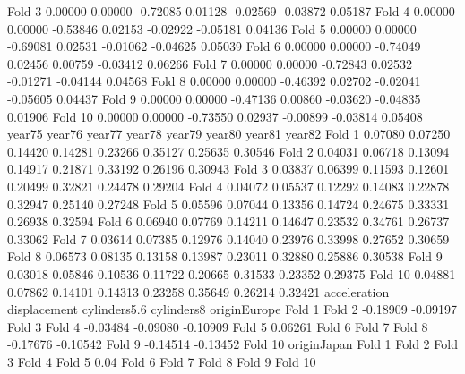 \documentclass[
]{jss}
\begin{document}
\begin{CodeChunk}
\begin{CodeOutput}
Fold 3     0.00000  0.00000 -0.72085  0.01128 -0.02569 -0.03872  0.05187
Fold 4     0.00000  0.00000 -0.53846  0.02153 -0.02922 -0.05181  0.04136
Fold 5     0.00000  0.00000 -0.69081  0.02531 -0.01062 -0.04625  0.05039
Fold 6     0.00000  0.00000 -0.74049  0.02456  0.00759 -0.03412  0.06266
Fold 7     0.00000  0.00000 -0.72843  0.02532 -0.01271 -0.04144  0.04568
Fold 8     0.00000  0.00000 -0.46392  0.02702 -0.02041 -0.05605  0.04437
Fold 9     0.00000  0.00000 -0.47136  0.00860 -0.03620 -0.04835  0.01906
Fold 10    0.00000  0.00000 -0.73550  0.02937 -0.00899 -0.03814  0.05408
          year75   year76   year77   year78   year79   year80   year81   year82
Fold 1   0.07080  0.07250  0.14420  0.14281  0.23266  0.35127  0.25635  0.30546
Fold 2   0.04031  0.06718  0.13094  0.14917  0.21871  0.33192  0.26196  0.30943
Fold 3   0.03837  0.06399  0.11593  0.12601  0.20499  0.32821  0.24478  0.29204
Fold 4   0.04072  0.05537  0.12292  0.14083  0.22878  0.32947  0.25140  0.27248
Fold 5   0.05596  0.07044  0.13356  0.14724  0.24675  0.33331  0.26938  0.32594
Fold 6   0.06940  0.07769  0.14211  0.14647  0.23532  0.34761  0.26737  0.33062
Fold 7   0.03614  0.07385  0.12976  0.14040  0.23976  0.33998  0.27652  0.30659
Fold 8   0.06573  0.08135  0.13158  0.13987  0.23011  0.32880  0.25886  0.30538
Fold 9   0.03018  0.05846  0.10536  0.11722  0.20665  0.31533  0.23352  0.29375
Fold 10  0.04881  0.07862  0.14101  0.14313  0.23258  0.35649  0.26214  0.32421
        acceleration displacement cylinders5.6 cylinders8 originEurope
Fold 1                                                                
Fold 2      -0.18909     -0.09197                                     
Fold 3                                                                
Fold 4      -0.03484                  -0.09080   -0.10909             
Fold 5                                                         0.06261
Fold 6                                                                
Fold 7                                                                
Fold 8      -0.17676     -0.10542                                     
Fold 9      -0.14514     -0.13452                                     
Fold 10                                                               
        originJapan
Fold 1             
Fold 2             
Fold 3             
Fold 4             
Fold 5         0.04
Fold 6             
Fold 7             
Fold 8             
Fold 9             
Fold 10            
\end{CodeOutput}
\end{CodeChunk}
\end{document}
